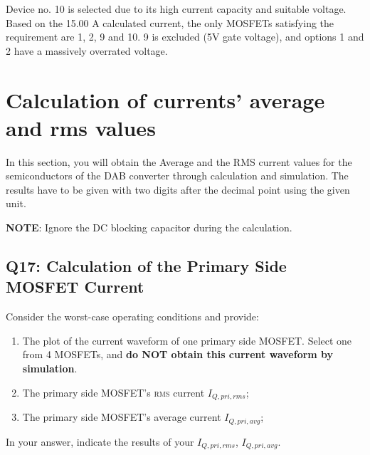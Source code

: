\documentclass{PELsmallreport}
\begin{document}
\begin{framed}
    \vspace{2em}
    Device no. 10 is selected due to its high current capacity and suitable voltage. Based on the 15.00 A calculated current, the only MOSFETs satisfying the requirement are 1, 2, 9 and 10. 9 is excluded (5V gate voltage), and options 1 and 2 have a massively overrated voltage. 
  \vspace{2em}
\end{framed}

 \hfill{}

\clearpage

\section{Calculation of currents' average and rms values}
In this section, you will obtain the Average and the RMS current values for the semiconductors of the DAB converter through calculation and simulation. The results have to be given with two digits after the decimal point using the given unit. 

\textbf{NOTE}: Ignore the DC blocking capacitor during the calculation.

\subsection{Q17: Calculation of the Primary Side MOSFET Current}

Consider the worst-case operating conditions and provide:
\begin{enumerate}[label=\alph*)]
    \item The plot of the current waveform of one primary side MOSFET. Select one from 4 MOSFETs, and \textbf{do NOT obtain this current waveform by simulation}.
    \item The primary side MOSFET's \textsc{rms} current $I_{Q,pri,rms}$;
	\item The primary side MOSFET's average current $I_{Q,pri,avg}$;
\end{enumerate}

In your answer, indicate the results of your $I_{Q,pri,rms}$, $I_{Q,pri,avg}$.
\end{document}
